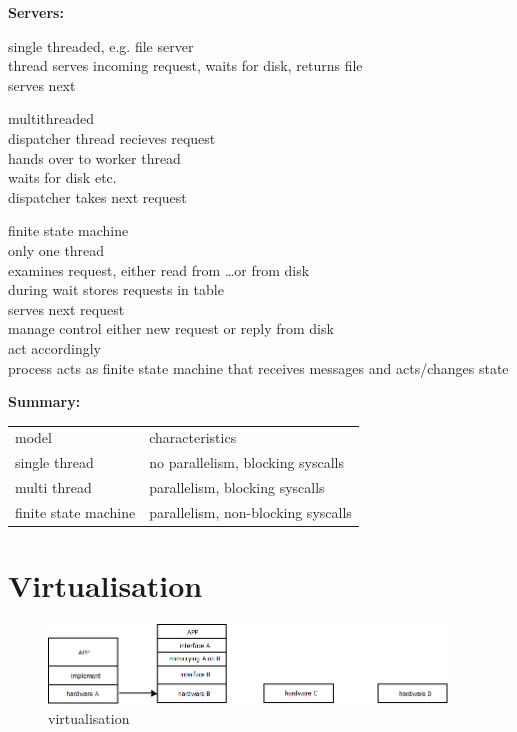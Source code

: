 \textbf{Servers:}\\
\begin{compactitem}
\item single threaded, e.g. file server\\
thread serves incoming request, waits for disk, returns file\\
serves next
\item multithreaded\\
dispatcher thread recieves request\\
hands over to worker thread\\
waits for disk etc.\\
dispatcher takes next request
\item finite state machine\\
only one thread\\
examines request, either read from \ldots or from disk\\
during wait stores requests in table\\
serves next request\\
manage control either new request or reply from disk\\
act accordingly\\
process acts as finite state machine that receives messages and acts/changes state
\end{compactitem}


\textbf{Summary:}\\
\begin{tabular}{l l}
model&characteristics\\
single thread& no parallelism, blocking syscalls\\
multi thread& parallelism, blocking syscalls\\
finite state machine& parallelism, non-blocking syscalls\\
\end{tabular}

\section{Virtualisation}
\begin{figure}[h]
	\centering
	\includegraphics[width=400px]{gfx/virtualisation_1.png}
	\caption{virtualisation}
	\label{img:virtualisation_1}
\end{figure}

